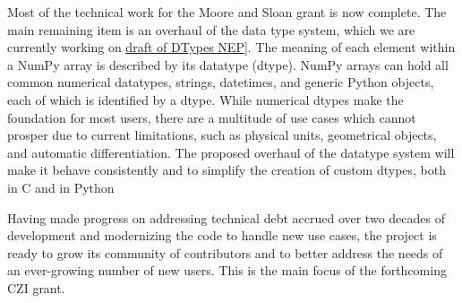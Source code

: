 Most of the technical work for the Moore and Sloan grant is now complete.
The main remaining item is an overhaul of the data type system, which
we are currently working on \href{https://github.com/numpy/numpy/pull/14422}{draft of DTypes NEP}].
The meaning of each element within a NumPy array is described by its
datatype (dtype). NumPy arrays can hold all common numerical
datatypes, strings, datetimes, and generic Python objects, each of
which is identified by a dtype.
While numerical dtypes make the foundation for most users,
there are a multitude of use cases which cannot prosper due to current
limitations, such as physical units\cite{astropy,Goldbaum2018,pint},
geometrical objects\cite{pygeos}, and automatic
differentiation\cite{pyadolc}.
The proposed overhaul of the datatype system will make it behave consistently and
to simplify the creation of custom dtypes, both in C and in Python



Having made progress on addressing technical debt accrued over two decades of
development and modernizing the code to handle new use cases, the project
is ready to grow its community of contributors and to better address the needs
of an ever-growing number of new users.  This is the main focus of the
forthcoming CZI grant.

